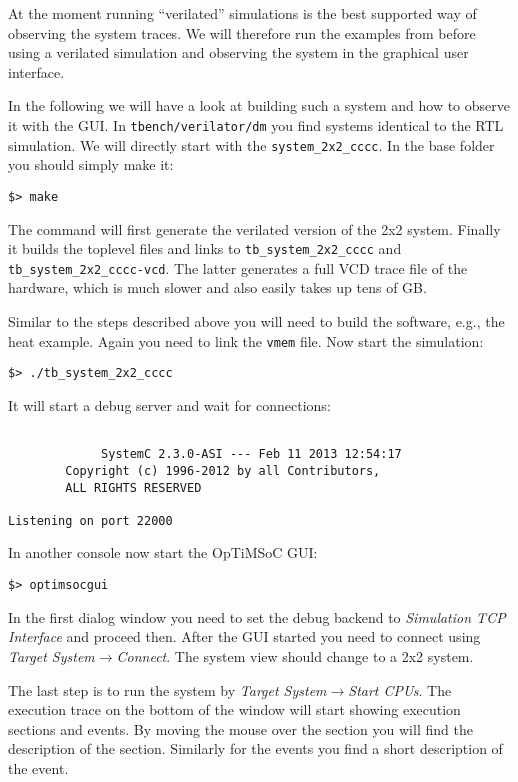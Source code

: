 At the moment running ``verilated'' simulations is the best supported
way of observing the system traces. We will therefore run the examples
from before using a verilated simulation and observing the system in
the graphical user interface.

In the following we will have a look at building such a system and how
to observe it with the GUI. In \verb|tbench/verilator/dm| you find
systems identical to the RTL simulation. We will directly start with
the \verb|system_2x2_cccc|. In the base folder you should simply make
it:

\begin{lstlisting}
$> make
\end{lstlisting}

The command will first generate the verilated version of the 2x2
system. Finally it builds the toplevel files and links to
\verb|tb_system_2x2_cccc| and \verb|tb_system_2x2_cccc-vcd|. The
latter generates a full VCD trace file of the hardware, which is
much slower and also easily takes up tens of GB.

Similar to the steps described above you will need to build the
software, e.g., the heat example. Again you need to link the
\verb|vmem| file. Now start the simulation:

\begin{lstlisting}
$> ./tb_system_2x2_cccc
\end{lstlisting}

It will start a debug server and wait for connections:

\begin{lstlisting}

             SystemC 2.3.0-ASI --- Feb 11 2013 12:54:17
        Copyright (c) 1996-2012 by all Contributors,
        ALL RIGHTS RESERVED

Listening on port 22000
\end{lstlisting}

In another console now start the OpTiMSoC GUI:

\begin{lstlisting}
$> optimsocgui
\end{lstlisting}

In the first dialog window you need to set the debug backend to
\emph{Simulation TCP Interface} and proceed then. After the GUI
started you need to connect using \emph{Target
  System}$\rightarrow$\emph{Connect}. The system view should change to
a 2x2 system.

The last step is to run the system by \emph{Target
  System}$\rightarrow$\emph{Start CPUs}. The execution trace on the
bottom of the window will start showing execution sections and events.
By moving the mouse over the section you will find the description of
the section. Similarly for the events you find a short description of
the event.

